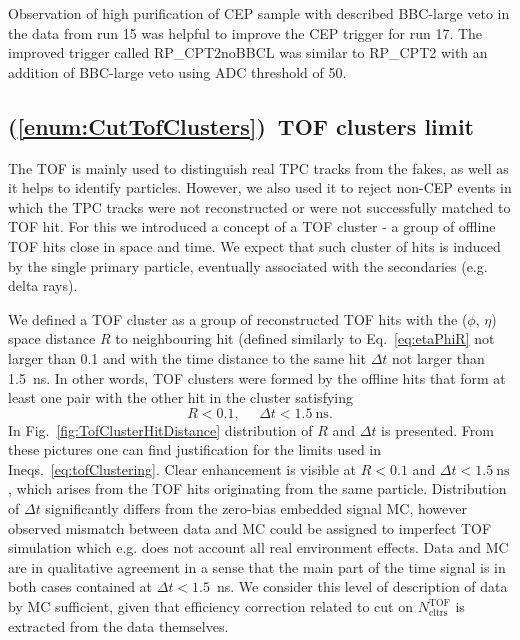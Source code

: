 Observation of high purification of CEP sample with described BBC-large veto in the data from run 15 was helpful to improve the CEP trigger for run 17. The improved trigger called RP\_CPT2noBBCL was similar to RP\_CPT2 with an addition of BBC-large veto using ADC threshold of 50.




\subsection{(\ref{enum:CutTofClusters})~TOF clusters limit}\label{sec:C7}

The TOF is mainly used to distinguish real TPC tracks from the fakes, as well as it helps to identify particles. However, we also used it to reject non-CEP events in which the TPC tracks were not reconstructed or were not successfully matched to TOF hit. For this we introduced a concept of a TOF cluster - a group of offline TOF hits close in space and time. We expect that such cluster of hits is induced by the single primary particle, eventually associated with the secondaries (e.g. delta rays).

We defined a TOF cluster as a group of reconstructed TOF hits with the ($\phi$, $\eta$) space distance $R$ to neighbouring hit (defined similarly to Eq.~\eqref{eq:etaPhiR} not larger than 0.1 and with the time distance to the same hit $\Delta t$ not larger than 1.5~ns. In other words, TOF clusters were formed by the offline hits that form at least one pair with the other hit in the cluster satisfying
\begin{equation}\label{eq:tofClustering}
 R<0.1,~~~~~~\Delta t<1.5~\text{ns}.
\end{equation}
In Fig.~\ref{fig:TofClusterHitDistance} distribution of $R$ and $\Delta t$ is presented. From these pictures one can find justification for the limits used in Ineqs.~\eqref{eq:tofClustering}. Clear enhancement is visible at $R<0.1$ and $\Delta t<1.5~\text{ns}$, which arises from the TOF hits originating from the same particle. Distribution of $\Delta t$ significantly differs from the zero-bias embedded signal MC, however observed mismatch between data and MC could be assigned to imperfect TOF simulation which e.g. does not account all real environment effects. Data and MC are in qualitative agreement in a sense that the main part of the time signal is in both cases contained at $\Delta t<1.5$~ns. We consider this level of description of data by MC sufficient, given that efficiency correction related to cut on $N^{\text{TOF}}_{\text{cltrs}}$ is extracted from the data themselves.


